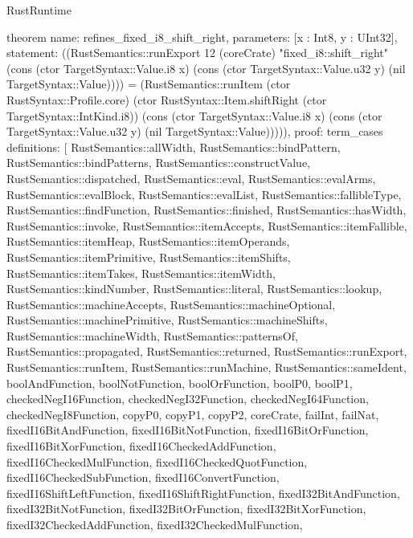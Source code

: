 \begin{lexlean}{RustRuntime}
\begin{semanticmodule}
theorem{
  name: refines_fixed_i8_shift_right,
  parameters: [x : Int8, y : UInt32],
  statement: ((RustSemantics::runExport 12 (coreCrate) "fixed_i8::shift_right" (cons (ctor TargetSyntax::Value.i8 x) (cons (ctor TargetSyntax::Value.u32 y) (nil TargetSyntax::Value)))) = (RustSemantics::runItem (ctor RustSyntax::Profile.core) (ctor RustSyntax::Item.shiftRight (ctor TargetSyntax::IntKind.i8)) (cons (ctor TargetSyntax::Value.i8 x) (cons (ctor TargetSyntax::Value.u32 y) (nil TargetSyntax::Value))))),
  proof: term_cases{
    definitions: [
      RustSemantics::allWidth,
      RustSemantics::bindPattern,
      RustSemantics::bindPatterns,
      RustSemantics::constructValue,
      RustSemantics::dispatched,
      RustSemantics::eval,
      RustSemantics::evalArms,
      RustSemantics::evalBlock,
      RustSemantics::evalList,
      RustSemantics::fallibleType,
      RustSemantics::findFunction,
      RustSemantics::finished,
      RustSemantics::hasWidth,
      RustSemantics::invoke,
      RustSemantics::itemAccepts,
      RustSemantics::itemFallible,
      RustSemantics::itemHeap,
      RustSemantics::itemOperands,
      RustSemantics::itemPrimitive,
      RustSemantics::itemShifts,
      RustSemantics::itemTakes,
      RustSemantics::itemWidth,
      RustSemantics::kindNumber,
      RustSemantics::literal,
      RustSemantics::lookup,
      RustSemantics::machineAccepts,
      RustSemantics::machineOptional,
      RustSemantics::machinePrimitive,
      RustSemantics::machineShifts,
      RustSemantics::machineWidth,
      RustSemantics::patternsOf,
      RustSemantics::propagated,
      RustSemantics::returned,
      RustSemantics::runExport,
      RustSemantics::runItem,
      RustSemantics::runMachine,
      RustSemantics::sameIdent,
      boolAndFunction,
      boolNotFunction,
      boolOrFunction,
      boolP0,
      boolP1,
      checkedNegI16Function,
      checkedNegI32Function,
      checkedNegI64Function,
      checkedNegI8Function,
      copyP0,
      copyP1,
      copyP2,
      coreCrate,
      failInt,
      failNat,
      fixedI16BitAndFunction,
      fixedI16BitNotFunction,
      fixedI16BitOrFunction,
      fixedI16BitXorFunction,
      fixedI16CheckedAddFunction,
      fixedI16CheckedMulFunction,
      fixedI16CheckedQuotFunction,
      fixedI16CheckedSubFunction,
      fixedI16ConvertFunction,
      fixedI16ShiftLeftFunction,
      fixedI16ShiftRightFunction,
      fixedI32BitAndFunction,
      fixedI32BitNotFunction,
      fixedI32BitOrFunction,
      fixedI32BitXorFunction,
      fixedI32CheckedAddFunction,
      fixedI32CheckedMulFunction,
}}
\end{semanticmodule}
\end{lexlean}
